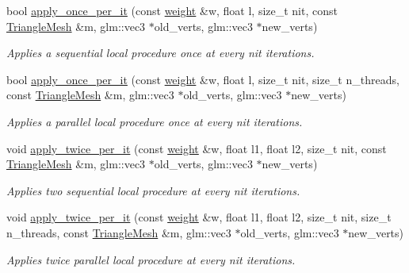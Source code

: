 \begin{DoxyCompactItemize}
bool \hyperlink{namespacegeoproc_1_1smoothing_1_1local__private_a2f0145cf84135b79813338e5cd18ab87}{apply\+\_\+once\+\_\+per\+\_\+it} (const \hyperlink{namespacegeoproc_a12e5a10581b53b9dd9a509127527f843}{weight} \&w, float l, size\+\_\+t nit, const \hyperlink{classgeoproc_1_1TriangleMesh}{Triangle\+Mesh} \&m, glm\+::vec3 $\ast$old\+\_\+verts, glm\+::vec3 $\ast$new\+\_\+verts)
\begin{DoxyCompactList}\small\item\em Applies a sequential local procedure once at every {\itshape nit} iterations. \end{DoxyCompactList}\item 
bool \hyperlink{namespacegeoproc_1_1smoothing_1_1local__private_a02e50268720d1728f61cf280998d4b0e}{apply\+\_\+once\+\_\+per\+\_\+it} (const \hyperlink{namespacegeoproc_a12e5a10581b53b9dd9a509127527f843}{weight} \&w, float l, size\+\_\+t nit, size\+\_\+t n\+\_\+threads, const \hyperlink{classgeoproc_1_1TriangleMesh}{Triangle\+Mesh} \&m, glm\+::vec3 $\ast$old\+\_\+verts, glm\+::vec3 $\ast$new\+\_\+verts)
\begin{DoxyCompactList}\small\item\em Applies a parallel local procedure once at every {\itshape nit} iterations. \end{DoxyCompactList}\item 
void \hyperlink{namespacegeoproc_1_1smoothing_1_1local__private_a47b625e62ff0e3311c49bacaecb0a020}{apply\+\_\+twice\+\_\+per\+\_\+it} (const \hyperlink{namespacegeoproc_a12e5a10581b53b9dd9a509127527f843}{weight} \&w, float l1, float l2, size\+\_\+t nit, const \hyperlink{classgeoproc_1_1TriangleMesh}{Triangle\+Mesh} \&m, glm\+::vec3 $\ast$old\+\_\+verts, glm\+::vec3 $\ast$new\+\_\+verts)
\begin{DoxyCompactList}\small\item\em Applies two sequential local procedure at every {\itshape nit} iterations. \end{DoxyCompactList}\item 
void \hyperlink{namespacegeoproc_1_1smoothing_1_1local__private_ab4056c7402c96ea773e3d26d95b57033}{apply\+\_\+twice\+\_\+per\+\_\+it} (const \hyperlink{namespacegeoproc_a12e5a10581b53b9dd9a509127527f843}{weight} \&w, float l1, float l2, size\+\_\+t nit, size\+\_\+t n\+\_\+threads, const \hyperlink{classgeoproc_1_1TriangleMesh}{Triangle\+Mesh} \&m, glm\+::vec3 $\ast$old\+\_\+verts, glm\+::vec3 $\ast$new\+\_\+verts)
\begin{DoxyCompactList}\small\item\em Applies twice parallel local procedure at every {\itshape nit} iterations. \end{DoxyCompactList}\end{DoxyCompactItemize}



